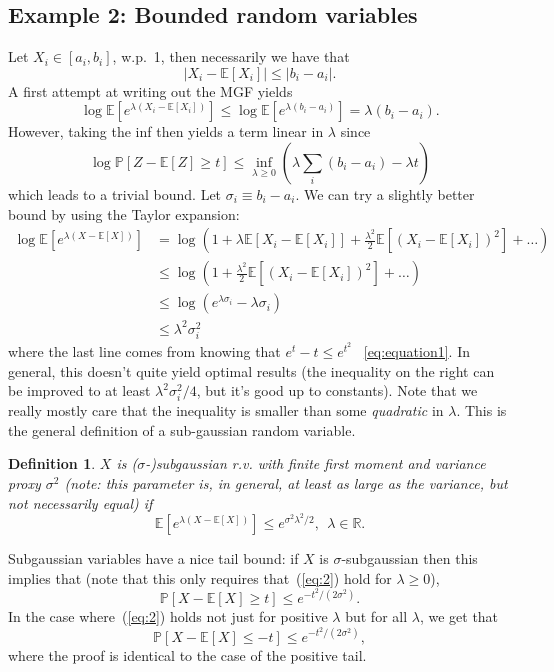 \documentclass[11pt]{article}
\newcommand{\ex}[1]{\mathbb{E}\left[{#1}\right]}
\newcommand{\pp}[1]{\mathbb{P}\left[{#1}\right]}
\newcommand{\reals}{\mathbb{R}}
\newtheorem{definition}{Definition}
\begin{document}
\subsection{Example 2: Bounded random variables}
Let $X_i \in [a_i, b_i]$, w.p.\ 1, then necessarily we have that
\[
  |X_i - \ex{X_i}| \le |b_i - a_i|.
\]
A first attempt at writing out the MGF yields
\[
  \log \ex{e^{\lambda(X_i - \ex{X_i})}} \le \log \ex{e^{\lambda(b_i - a_i)}} = \lambda(b_i - a_i).
\]
However, taking the inf then yields a term linear in $\lambda$ since
\[
  \log \pp{Z - \ex{Z} \ge t} \le \inf_{\lambda \ge 0} \left(\lambda\sum_i (b_i - a_i) - \lambda t\right)
\]
which leads to a trivial bound. Let $\sigma_i \equiv b_i - a_i$. We can try a slightly better bound by using the Taylor expansion:
\begin{align*}
  \log \ex{e^{\lambda(X - \ex{X})}} &= \log \left(1 + \lambda \ex{X_i - \ex{X_i}} + \frac{\lambda^2}{2}\ex{\left(X_i - \ex{X_i}\right)^2 } + \dots\right)\\
                                    &\le \log \left( 1 + \frac{\lambda^2}{2}\ex{\left(X_i - \ex{X_i}\right)^2 } + \dots \right) \\
                                    &\le \log \left(e^{\lambda \sigma_i } - \lambda \sigma_i\right)\\
                                    &\le \lambda^2 \sigma_i^2
\end{align*}
where the last line comes from knowing that $e^t - t \le e^{t^2}$ ~\ref{eq:equation1}. In general, this doesn't quite yield optimal results (the inequality on the right can be improved to at least $\lambda^2\sigma_i^2/4$, but it's good up to constants). Note that we really mostly care that the inequality is smaller than some \textit{quadratic} in $\lambda$. This is the general definition of a sub-gaussian random variable.

\begin{definition}
  $X$ is ($\sigma$-)subgaussian r.v. with finite first moment and variance proxy $\sigma^2$ (note: this parameter is, in general, at least as large as the variance, but \textit{not necessarily equal}) if
  \begin{equation}\label{eq:2}
    \ex{e^{\lambda(X - \ex{X})}} \le e^{\sigma^2\lambda^2/2}, ~~  \lambda \in \reals.
  \end{equation}
\end{definition}
Subgaussian variables have a nice tail bound: if $X$ is $\sigma$-subgaussian then this implies that (note that this only requires that~(\ref{eq:2}) hold for $\lambda \ge 0$),
\[
  \pp{X - \ex{X} \ge t} \le e^{-t^2/(2\sigma^2)}.
\]
In the case where~(\ref{eq:2}) holds not just for positive $\lambda$ but for all $\lambda$, we get that
\[
  \pp{X - \ex{X} \le -t} \le e^{-t^2/(2\sigma^2)},
\]
where the proof is identical to the case of the positive tail.
\end{document}
